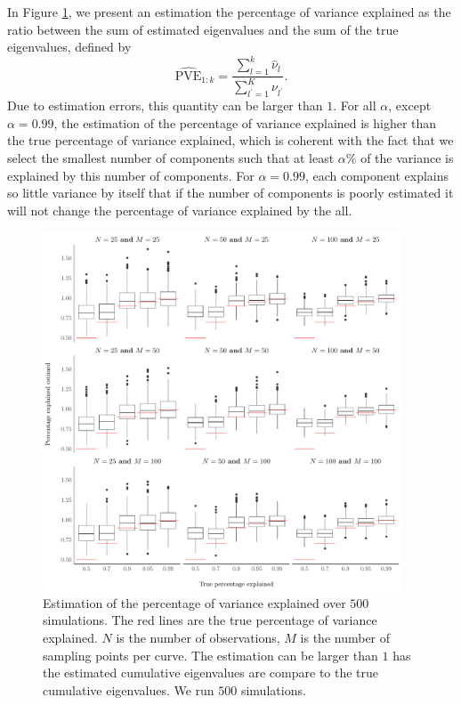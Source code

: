 In Figure \ref{fig:pct_estim}, we present an estimation the percentage of variance explained as the ratio between the sum of estimated eigenvalues and the sum of the true eigenvalues, defined by
\begin{equation}
     \widehat{\text{PVE}}_{1:k} = \frac{\sum_{l = 1}^k \widehat{\nu}_l}{\sum_{l^\prime = 1}^K \nu_{l^\prime}}.
\end{equation}
Due to estimation errors, this quantity can be larger than $1$. For all $\alpha$, except $\alpha = 0.99$, the estimation of the percentage of variance explained is higher than the true percentage of variance explained, which is coherent with the fact that we select the smallest number of components such that at least $\alpha\%$ of the variance is explained by this number of components. For $\alpha = 0.99$, each component explains so little variance by itself that if the number of components is poorly estimated it will not change the percentage of variance explained by the all.
\begin{figure}
     \centering
    \includegraphics[width=0.95\textwidth]{figures/pct_estim.pdf}
    \caption{Estimation of the percentage of variance explained over $500$ simulations. The red lines are the true percentage of variance explained. $N$ is the number of observations, $M$ is the number of sampling points per curve. The estimation can be larger than $1$ has the estimated cumulative eigenvalues are compare to the true cumulative eigenvalues. We run $500$ simulations.}
    \label{fig:pct_estim}
\end{figure}

